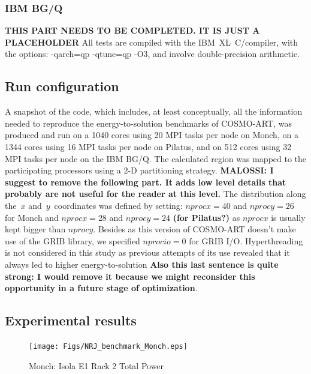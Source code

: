 \subsubsection{IBM BG/Q}
\textbf{THIS PART NEEDS TO BE COMPLETED. IT IS JUST A PLACEHOLDER}
All tests are compiled with the IBM~XL~C/\cpp compiler, with the options: {\ttfamily\scriptsize -qarch=qp -qtune=qp -O3}, and involve double-precision arithmetic.


\subsection{Run configuration}
\label{subsec:4.3}
A snapshot of the code, which includes, at least conceptually, all the
information needed  to reproduce the  energy-to-solution benchmarks of
COSMO-ART, was produced and run on a 1040 cores using 20 MPI tasks per
node on  Monch, on a  1344 cores using  16 MPI  tasks per  node on
Pilatus, and on 512 cores using 32 MPI tasks per node on the IBM BG/Q.
The  calculated  region  was mapped  to  the  participating
processors using  a 2-D partitioning strategy.   \textbf{MALOSSI: I suggest to remove the following part. It adds low level details that probably are not useful for the reader at this level.}
The distribution along
the~$x$ and~$y$~coordinates  was defined  by  setting: $nprocx=40$  and
$nprocy=26$ for  Monch and $nprocx=28$ and $nprocy=24$ \textbf{(for Pilatus?)} as $nprocx$ is
usually  kept  bigger  than  $nprocy$.   Besides as  this  version  of
COSMO-ART  doesn't  make  use   of  the  GRIB  library,  we  specified
$nprocio=0$ for  GRIB I/O.  Hyperthreading  is not considered  in this
study as previous  attempts of its use revealed that  it always led to
higher energy-to-solution \textbf{Also this last sentence is quite strong: I would remove it because we might reconsider this opportunity in a future stage of optimization}.\\

\subsection{Experimental results}
\label{subsec:4.4}

\begin{figure}[htbf]
  \begin{center}
    \texttt{[image: Figs/NRJ\_benchmark\_Monch.eps]}
    \caption{Monch: Isola E1 Rack 2 Total Power}
    \label{fig:1}
  \end{center}
\end{figure}

